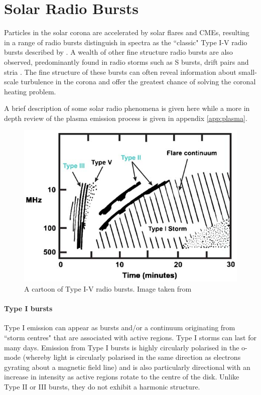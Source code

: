 \section{Solar Radio Bursts}
Particles in the solar corona are accelerated by solar flares and CMEs, resulting in a range of radio bursts distinguish in spectra as the ``classic" Type I-V radio bursts described by \cite{Wild1950}. A wealth of other fine structure radio bursts are also observed, predominantly found in radio storms such as S bursts, drift pairs and stria \citep{McConnell1980,Melrose1982,NelsonandMelrose1985}. 
 The fine structure of these bursts can often reveal information about small-scale turbulence in the corona \citep{Kontar2017} and offer the greatest chance of solving the coronal heating problem.


A brief description of some solar radio phenomena is given here while a more in depth review of the plasma emission process is given in appendix \ref{app:plasma}.
\begin{figure}
    \centering
    \includegraphics[width=0.75\columnwidth]{Images/Burst_cartoon.jpg}
    \caption[Cartoon of Type I-V radio bursts]{A cartoon of Type I-V radio bursts. Image taken from \cite{Cliver2009}}
    \label{fig:burst_cartoon}
\end{figure}
\paragraph{Type I bursts}
Type I emission can appear as bursts and/or a continuum originating from ``storm centres" that are associated with active regions. Type I storms can last for many days. Emission from Type I bursts is highly circularly polarised in the o-mode (whereby light is circularly polarised in the same direction as electrons gyrating about a magnetic field line) and is also particularly directional with an increase in intensity as active regions rotate to the centre of the disk. Unlike Type II or III bursts, they do not exhibit a harmonic structure.
